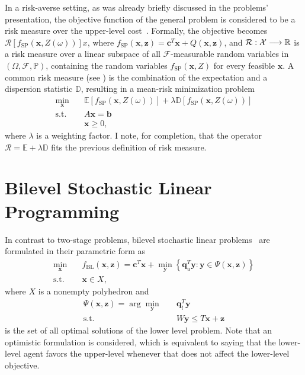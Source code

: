 \documentclass[12pt]{article}
\begin{document}
In a risk-averse setting, as was already briefly discussed in the problems' presentation, the objective function of the general problem is considered to be a risk measure over the upper-level cost~\citep{noyanRiskaverseTwostageStochastic2012,millerRiskAverseTwoStageStochastic2011,ahmedConvexityDecompositionMeanrisk2006}.
Formally, the objective becomes $\mathcal{R}\left[ f_\text{SP}(\bm{x},Z(\omega)) \right]x $, where $f_{\text{SP}}(\bm{x},\bm{z}) = \bm{c}^{T}\bm{x} + Q(\bm{x},\bm{z})$, and $\mathcal{R}: \mathcal{X} \longrightarrow \mathbb{R}$ is a risk measure over a linear subspace of all $\mathcal{F}$-measurable random variables in $\left( \Omega, \mathcal{F},\mathbb{P} \right)$, containing the random variables $f_\text{SP}(\bm{x},Z)$ for every feasible $\bm{x}$.
A common risk measure (see \citet{noyanRiskaverseTwostageStochastic2012}) is the combination of the expectation and a dispersion statistic $\mathbb{D}$, resulting in a mean-risk minimization problem
\begin{align*}
    \min_{\bm{x}} \quad & \mathbb{E}\left[ f_\text{SP}(\bm{x},Z(\omega)) \right] + \lambda \mathbb{D}\left[ f_\text{SP}(\bm{x},Z(\omega)) \right] \\
    \textrm{s.t.} \quad & A\bm{x} = \bm{b} \\
      & \bm{x} \ge 0
,\end{align*}
where $\lambda$ is a weighting factor.
I note, for completion, that the operator $\mathcal{R} = \mathbb{E} + \lambda \mathbb{D}$ fits the previous definition of risk measure.

\section*{Bilevel Stochastic Linear Programming}

In contrast to two-stage problems, bilevel stochastic linear problems~\citep{burtscheidtBilevelLinearOptimization2020} are formulated in their parametric form as
\begin{align*}
\min_{\bm{x}} \quad & f_\text{BL}(\bm{x},\bm{z}) = \bm{c}^{T}\bm{x} + \min_{\bm{y}}\left\{ \bm{q}_u^{T}\bm{y} : \bm{y} \in \Psi(\bm{x},\bm{z}) \right\}  \\
    \textrm{s.t.} \quad & \bm{x} \in X
,\end{align*}
where $X$ is a nonempty polyhedron and
\begin{align*}
    \Psi(\bm{x}, \bm{z}) = \arg\min_{\bm{y}} \quad & \bm{q}_l^{T} \bm{y} \\
    \textrm{s.t.} \quad & W\bm{y} \le T\bm{x} + \bm{z}
\end{align*}
is the set of all optimal solutions of the lower level problem.
Note that an optimistic formulation is considered, which is equivalent to saying that the lower-level agent favors the upper-level whenever that does not affect the lower-level objective. 
\end{document}
